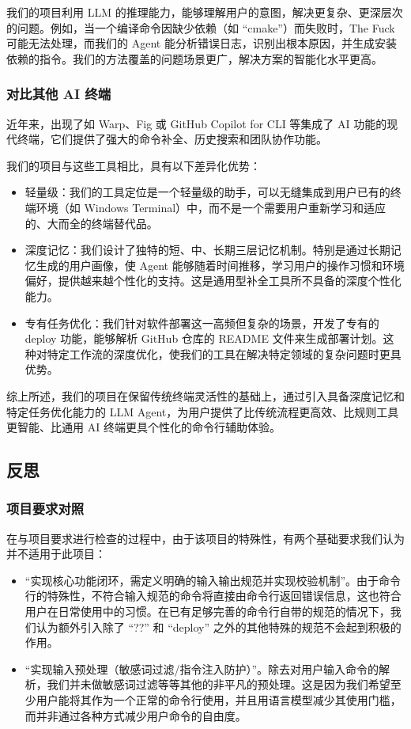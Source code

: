 \documentclass{article}
\theoremstyle{plain}
\theoremstyle{definition}
\theoremstyle{remark}
\begin{document}
我们的项目利用 LLM 的推理能力，能够理解用户的意图，解决更复杂、更深层次的问题。例如，当一个编译命令因缺少依赖（如 “cmake”）而失败时，The Fuck 可能无法处理，而我们的 Agent 能分析错误日志，识别出根本原因，并生成安装依赖的指令。我们的方法覆盖的问题场景更广，解决方案的智能化水平更高。

\subsubsection{对比其他 AI 终端}

近年来，出现了如 Warp、Fig 或 GitHub Copilot for CLI 等集成了 AI 功能的现代终端，它们提供了强大的命令补全、历史搜索和团队协作功能。

我们的项目与这些工具相比，具有以下差异化优势：

\begin{itemize}
    \item 轻量级：我们的工具定位是一个轻量级的助手，可以无缝集成到用户已有的终端环境（如 Windows Terminal）中，而不是一个需要用户重新学习和适应的、大而全的终端替代品。
    \item 深度记忆：我们设计了独特的短、中、长期三层记忆机制。特别是通过长期记忆生成的用户画像，使 Agent 能够随着时间推移，学习用户的操作习惯和环境偏好，提供越来越个性化的支持。这是通用型补全工具所不具备的深度个性化能力。
    \item 专有任务优化：我们针对软件部署这一高频但复杂的场景，开发了专有的 deploy 功能，能够解析 GitHub 仓库的 README 文件来生成部署计划。这种对特定工作流的深度优化，使我们的工具在解决特定领域的复杂问题时更具优势。
\end{itemize}

综上所述，我们的项目在保留传统终端灵活性的基础上，通过引入具备深度记忆和特定任务优化能力的 LLM Agent，为用户提供了比传统流程更高效、比规则工具更智能、比通用 AI 终端更具个性化的命令行辅助体验。

\subsection{反思}

\subsubsection{项目要求对照}

在与项目要求进行检查的过程中，由于该项目的特殊性，有两个基础要求我们认为并不适用于此项目：


\begin{itemize}
\item “实现核心功能闭环，需定义明确的输入输出规范并实现校验机制”。由于命令行的特殊性，不符合输入规范的命令将直接由命令行返回错误信息，这也符合用户在日常使用中的习惯。在已有足够完善的命令行自带的规范的情况下，我们认为额外引入除了 “??” 和 “deploy” 之外的其他特殊的规范不会起到积极的作用。

\item “实现输入预处理（敏感词过滤/指令注入防护）”。除去对用户输入命令的解析，我们并未做敏感词过滤等等其他的非平凡的预处理。这是因为我们希望至少用户能将其作为一个正常的命令行使用，并且用语言模型减少其使用门槛，而并非通过各种方式减少用户命令的自由度。
\end{itemize}
\end{document}
